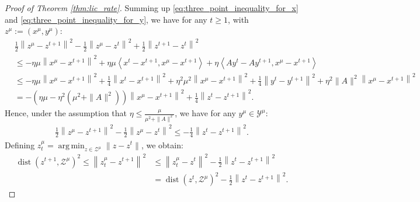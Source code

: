\documentclass{article}
\DeclareMathOperator*{\argmin}{arg\,min}
\DeclareMathOperator{\dist}{dist}
\newcommand{\Y}{\mathcal{Y}}
\newcommand{\Z}{\mathcal{Z}}
\theoremstyle{plain}
\begin{document}
\begin{proof}[Proof of Theorem \ref{thm:lic_rate}]
    Summing up \eqref{eq:three_point_inequality_for_x} and \eqref{eq:three_point_inequality_for_y}, we have for any $t\geq 1$, with $z^{\mu} := (x^{\mu}, y^{\mu})$:
    \begin{align*}
        & \frac{1}{2}\left\|z^{\mu} - z^{t+1}\right\|^2 - \frac{1}{2}\left\|z^{\mu} - z^t\right\|^2 + \frac{1}{2}\left\|z^{t+1} - z^t\right\|^2                                                                                                             \\
        & \leq - \eta \mu\left\|x^{\mu} - x^{t+1}\right\|^2 +\eta \mu\left\langle x^t - x^{t+1}, x^{\mu} - x^{t+1}\right\rangle + \eta \left\langle Ay^t - Ay^{t+1}, x^{\mu} - x^{t+1}\right\rangle                                                         \\
        & \leq - \eta \mu\left\|x^{\mu} - x^{t+1}\right\|^2 + \frac{1}{4}\left\| x^t - x^{t+1}\right\|^2 + \eta^2 \mu^2\left\| x^{\mu} - x^{t+1}\right\|^2 + \frac{1}{4}\left\| y^t - y^{t+1}\right\|^2 + \eta^2 \|A\|^2\left\| x^{\mu} - x^{t+1}\right\|^2 \\
        & = -\left(\eta \mu - \eta^2(\mu^2 + \|A\|^2)\right)\left\|x^{\mu} - x^{t+1}\right\|^2 + \frac{1}{4}\left\| z^t - z^{t+1}\right\|^2.
    \end{align*}
    Hence, under the assumption that $\eta \leq \frac{\mu}{\mu^2 + \|A\|^2}$, we have for any $y^{\mu}\in \Y^{\mu}$:
    \begin{align*}
        \frac{1}{2}\left\|z^{\mu} - z^{t+1}\right\|^2 - \frac{1}{2}\left\|z^{\mu} - z^t\right\|^2 \leq - \frac{1}{4}\left\| z^t - z^{t+1}\right\|^2.
    \end{align*}
    Defining $z_t^{\mu} = \argmin_{z\in \Z^{\mu}}\|z - z^t\|$, we obtain:
    \begin{align}
        \dist(z^{t+1}, \Z^{\mu})^2 \leq \left\|z_t^{\mu} - z^{t+1}\right\|^2 & \leq \left\|z_t^{\mu} - z^t\right\|^2 - \frac{1}{2}\left\| z^t - z^{t+1}\right\|^2 \nonumber \\
                                                                            & = \dist(z^t, \Z^{\mu})^2 - \frac{1}{2}\left\| z^t - z^{t+1}\right\|^2.
        \label{eq:three_point_inequality_for_z}
    \end{align}


\end{proof}
\end{document}
